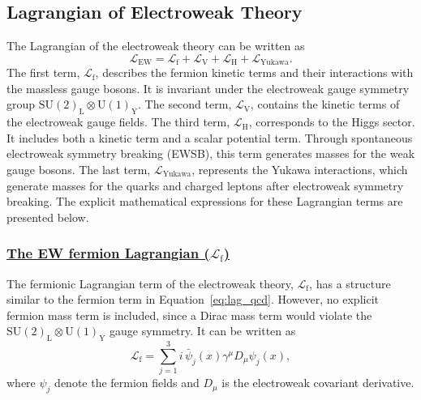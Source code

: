 \subsection{Lagrangian of Electroweak Theory}
\label{EW-theory}

The Lagrangian of the electroweak theory can be written as
\begin{equation}
\label{eq:lag_ew}
\mathcal{L}_{\text{EW}} 
= \mathcal{L}_{\text{f}}
+ \mathcal{L}_{\text{V}} 
+ \mathcal{L}_{\text{H}}
+ \mathcal{L}_{\text{Yukawa}} .
\end{equation}
The first term, $\mathcal{L}_{\text{f}}$, describes the fermion kinetic terms and their interactions with the massless gauge bosons. It is invariant under the electroweak gauge symmetry group $\mathrm{SU}(2)_{\text{L}} \otimes \mathrm{U}(1)_{\text{Y}}$.
%
The second term, $\mathcal{L}_{\text{V}}$, contains the kinetic terms of the electroweak gauge fields.
%
The third term, $\mathcal{L}_{\text{H}}$, corresponds to the Higgs sector. It includes both a kinetic term and a scalar potential term. Through spontaneous electroweak symmetry breaking (EWSB), this term generates masses for the weak gauge bosons.
%
The last term, $\mathcal{L}_{\text{Yukawa}}$, represents the Yukawa interactions, which generate masses for the quarks and charged leptons after electroweak symmetry breaking.
%
The explicit mathematical expressions for these Lagrangian terms are presented below.

\subsubsection{\underline{The EW fermion Lagrangian ($\mathcal{L}_{\text{f}} $)} }
The fermionic Lagrangian term of the electroweak theory, $\mathcal{L}_{\text{f}}$, has a structure similar to the fermion term in Equation~\eqref{eq:lag_qcd}. However, no explicit fermion mass term is included, since a Dirac mass term would violate the $\mathrm{SU}(2)_{\text{L}} \otimes \mathrm{U}(1)_{\text{Y}}$ gauge symmetry. It can be written as
\begin{equation}
\label{eq:lag_ew_fermion}
\mathcal{L}_{\text{f}} 
= \sum_{j=1}^{3} i\, \bar{\psi}_{j}(x)\gamma^{\mu} D_{\mu} \psi_{j}(x),
\end{equation}
where $\psi_j$ denote the fermion fields and $D_\mu$ is the electroweak covariant derivative.

